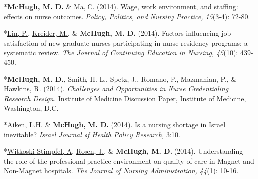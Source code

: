 \documentclass[10pt,]{article}
\begin{document}
{{{{{{{{{{{{{{{\begin{hangparas}{.25in}{1}
*{\textbf {McHugh, M. D.}} \& {\underline {Ma, C.}} (2014). Wage, work environment, and staffing: effects on nurse outcomes. {\textit {Policy, Politics, and Nursing Practice, 15}}(3-4): 72-80.

\end{hangparas}

\vspace{4mm}

\begin{hangparas}{.25in}{1}

*{\underline {Lin, P.}}, {\underline {Kreider, M.}}, \& {\textbf {McHugh, M. D.}} (2014). Factors influencing job satisfaction of new graduate nurses participating in nurse residency programs: a systematic review. {\textit {The Journal of Continuing Education in Nursing, 45}}(10): 439-450.

\end{hangparas}

\vspace{4mm}

\begin{hangparas}{.25in}{1}

*{\textbf {McHugh, M. D.}}, Smith, H. L., Spetz, J., Romano, P., Mazmanian, P., \& Hawkins, R. (2014). {\textit {Challenges and Opportunities in Nurse Credentialing Research Design.}} Institute of Medicine Discussion Paper, Institute of Medicine, Washington, D.C.

\end{hangparas}

\vspace{4mm}

\begin{hangparas}{.25in}{1}

*Aiken, L.H. \& {\textbf {McHugh, M. D.}} (2014). Is a nursing shortage in Israel inevitable? {\textit {Israel Journal of Health Policy Research,}} 3:10.

\end{hangparas}

\vspace{4mm}

\begin{hangparas}{.25in}{1}

*{\underline {Witkoski Stimpfel, A}}, {\underline {Rosen, J.}}, \& {\textbf {McHugh, M. D.}} (2014). Understanding the role of the professional practice environment on quality of care in Magnet and Non-Magnet hospitals. {\textit {The Journal of Nursing Administration, 44}}(1): 10-16.

\end{hangparas}

}}}}}}}}}}}}}}}
\end{document}
